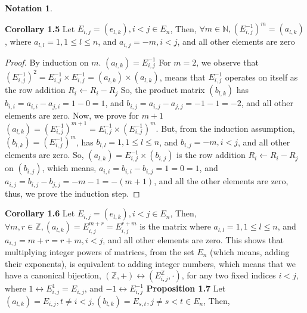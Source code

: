 \documentclass[12pt]{article}
\newtheorem{notation}[theorem]{Notation}
\begin{document}
\begin{notation}
\end{notation}
\newpage
\textbf{Corollary 1.5} \newline
Let $E_{i,j}=(e_{l,k}),i<j \in E_n$, Then,\newline
$\forall m \in \mathbb{N},(E_{i,j}^{-1})^m=(a_{l,k})$, where $a_{l,l}=1,1 \leq l \leq n$, and $a_{i,j}=-m,i<j$, and all other elements are zero
\begin{proof}
By induction on $m$. \newline
$(a_{l,k})=E_{i,j}^{-1}$
For $m=2$, we observe that $(E_{i,j}^{-1})^2=E_{i,j}^{-1} \times E_{i,j}^{-1}=(a_{l,k}) \times (a_{l,k})$, means that $E_{i,j}^{-1}$ operates on itself as the row addition $R_i \leftarrow R_i-R_j$ \newline
So, the product matrix $(b_{l,k})$ has $b_{i,i}=a_{i,i}-a_{j,i}=1-0=1$, and $b_{i,j}=a_{i,j}-a_{j,j}=-1-1=-2$, and all other elements are zero. \newline
Now, we prove for $m+1$ \newline
$(a_{l,k})=(E_{i,j}^{-1})^{m+1}=E_{i,j}^{-1} \times (E_{i,j}^{-1})^m$. But, from the induction assumption, $(b_{l,k})=(E_{i,j}^{-1})^m$, has $b_{l,l}=1,1 \leq l \leq n$, and $b_{i,j}=-m,i<j$, and all other elements are zero. \newline
So, $(a_{l,k})=E_{i,j}^{-1} \times (b_{i,j})$ is the row addition $R_i \leftarrow R_i-R_j$ on $(b_{i,j})$, which means, $a_{i,i}=b_{i,i}-b_{i,j}=1=0=1$, and $a_{i,j}=b_{i,j}-b_{j,j}=-m-1=-(m+1)$, and all the other elements are zero, thus, we prove the induction step. \newline
\end{proof}
\textbf{Corollary 1.6} 
Let $E_{i,j}=(e_{l,k}),i<j \in E_n$, Then,\newline
$\forall m,r \in \mathbb{Z},
(a_{l,k})=E_{i,j}^{m+r}=E_{i,j}^{r+m}$ is the matrix where $a_{l,l}=1,1 \leq l \leq n$, and $a_{i,j}=m+r=r+m,i<j$, and all other elements are zero. \newline
This shows that multiplying integer powers of matrices, from the set $E_n$ (which means, adding their exponents), is equivalent to adding integer numbers, which means that we have a canonical bijection, $(\mathbb{Z},+) \leftrightarrow (E_{i,j}^{\mathbb{Z}},\cdot)$, for any two fixed indices $i<j$, where $1 \leftrightarrow E_{i,j}^1=E_{i,j}$, and $-1 \leftrightarrow E_{i,j}^{-1}$ \newline 
\newpage
\textbf{Proposition 1.7} \newline
Let $(a_{l,k})=E_{i,j},t \neq i<j,(b_{l,k})=E_{s,t},j \neq s<t \in E_n$, Then, \newline
\end{document}
